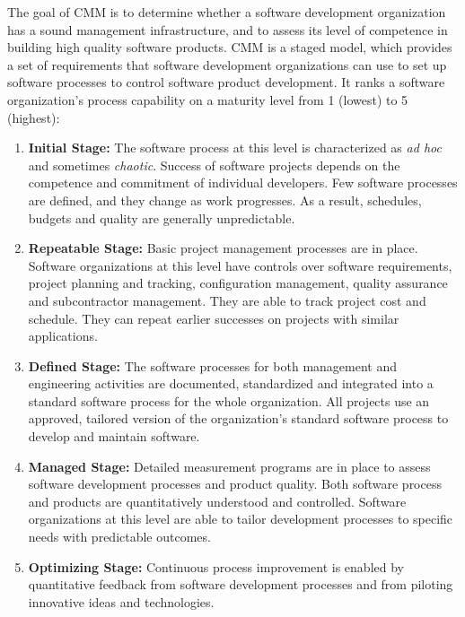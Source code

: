 The goal of CMM is to determine whether a software development organization has a sound management infrastructure, and to assess its level of competence in building high quality software products. CMM is a staged model, which provides a set of requirements that software development organizations can use to set up software processes to control software product development. It ranks a software organization's process capability on a maturity level from 1 (lowest) to 5 (highest):

\begin{enumerate}
  \item \textbf{Initial Stage:} The software process at this level is characterized as \textit{ad hoc} and sometimes \textit{chaotic}. Success of software projects depends on the competence and commitment of individual developers. Few software processes are defined, and they change as work progresses. As a result, schedules, budgets and quality are generally unpredictable.
  \item \textbf{Repeatable Stage:} Basic project management processes are in place. Software organizations at this level have controls over software requirements, project planning and tracking, configuration management, quality assurance and subcontractor management. They are able to track project cost and schedule. They can repeat earlier successes on projects with similar applications.
  \item \textbf{Defined Stage:} The software processes for both management and engineering activities are documented, standardized and integrated into a standard software process for the whole organization. All projects use an approved, tailored version of the organization's standard software process to develop and maintain software.
  \item \textbf{Managed Stage:} Detailed measurement programs are in place to assess software development processes and product quality. Both software process and products are quantitatively understood and controlled. Software organizations at this level are able to tailor development processes to specific needs with predictable outcomes.
  \item \textbf{Optimizing Stage:} Continuous process improvement is enabled by quantitative feedback from software development processes and from piloting innovative ideas and technologies.
\end{enumerate}

